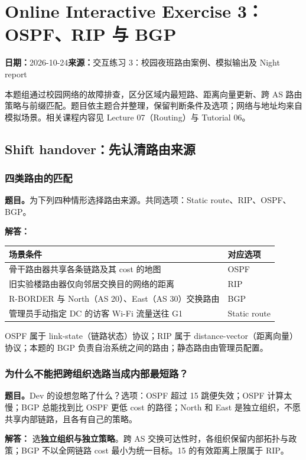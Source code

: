 \documentclass[11pt,a4paper,fontset=fandol]{ctexart}
\renewcommand{\exercisequestion}[2]{%
  \Needspace{5\baselineskip}%
  \subsubsection{#2}\label{exercise:#1}%
}
\renewcommand{\exercisemeta}[5]{%
  {\small\textbf{日期：}#2\quad\textbf{来源：}#3\par}%
}
\renewenvironment{checkedsolution}
  {\par\nopagebreak[4]\textbf{解答：}\ignorespaces}
  {\par}
\begin{document}
\clearpage
\section{Online Interactive Exercise 3：OSPF、RIP 与 BGP}
\label{homework:SC2008-HW03}
\exercisemeta
  {SC2008-HW03}
  {2026-10-24}
  {交互练习 3：校园夜班路由案例、模拟输出及 Night report}
  {已完成；按题面、输出与计算核对}
  {已确认完成}

本题组通过校园网络的故障排查，区分区域内最短路、距离向量更新、跨 AS 路由策略与前缀匹配。题目依主题合并整理，保留判断条件及选项；网络与地址均来自模拟场景。相关课程内容见 Lecture 07（Routing）与 Tutorial 06。

\subsection{Shift handover：先认清路由来源}

\exercisequestion{SC2008-HW03-Q01}{四类路由的匹配}
\textbf{题目。}为下列四种情形选择路由来源。共同选项：Static route、RIP、OSPF、BGP。
\begin{checkedsolution}
\begin{center}
\small
\begin{tabularx}{\textwidth}{@{}Xl@{}}
\toprule
场景条件 & 对应选项 \\
\midrule
骨干路由器共享各条链路及其 cost 的地图 & OSPF \\
旧实验楼路由器仅向邻居交换目的网络的距离 & RIP \\
R-BORDER 与 North（AS 20）、East（AS 30）交换路由 & BGP \\
管理员手动指定 DC 的访客 Wi-Fi 流量送往 G1 & Static route \\
\bottomrule
\end{tabularx}
\end{center}
OSPF 属于 link-state（链路状态）协议；RIP 属于 distance-vector（距离向量）协议；本题的 BGP 负责自治系统之间的路由；静态路由由管理员配置。
\end{checkedsolution}

\exercisequestion{SC2008-HW03-Q02}{为什么不能把跨组织选路当成内部最短路？}
\textbf{题目。}Dev 的设想忽略了什么？选项：OSPF 超过 15 跳便失效；OSPF 计算太慢；BGP 总能找到比 OSPF 更低 cost 的路径；North 和 East 是独立组织，不愿共享内部链路，且各有自己的策略。
\begin{checkedsolution}
选\textbf{独立组织与独立策略}。跨 AS 交换可达性时，各组织保留内部拓扑与政策；BGP 不以全网链路 cost 最小为统一目标。15 的有效距离上限属于 RIP。
\end{checkedsolution}
\end{document}
